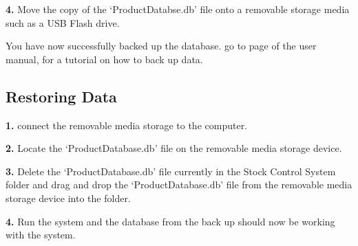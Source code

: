 \textbf{4.} Move the copy of the `ProductDatabse.db' file onto a removable storage media such as a USB Flash drive.

You have now successfully backed up the database. go to page \pageref{fig:Restoring Data}of the user manual, for a tutorial on how to back up data.

\subsection{Restoring Data}
\label{fig:Restoring Data}

\textbf{1.} connect the removable media storage to the computer.

\textbf{2.} Locate the `ProductDatabase.db' file on the removable media storage device.

\textbf{3.} Delete the `ProductDatabase.db' file currently in the Stock Control System folder and drag and drop the `ProductDatabase.db' file from the removable media storage device into the folder.

\textbf{4.} Run the system and the database from the back up should now be working with the system.

\stopcontents[chapters]